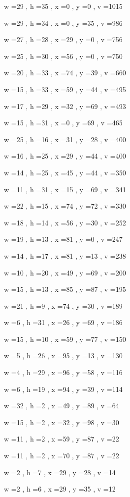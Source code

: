 \documentclass[11pt]{article}
\begin{document}
w =29 , h =35 , x =0 , y =0 , v =1015
\par
w =29 , h =34 , x =0 , y =35 , v =986
\par
w =27 , h =28 , x =29 , y =0 , v =756
\par
w =25 , h =30 , x =56 , y =0 , v =750
\par
w =20 , h =33 , x =74 , y =39 , v =660
\par
w =15 , h =33 , x =59 , y =44 , v =495
\par
w =17 , h =29 , x =32 , y =69 , v =493
\par
w =15 , h =31 , x =0 , y =69 , v =465
\par
w =25 , h =16 , x =31 , y =28 , v =400
\par
w =16 , h =25 , x =29 , y =44 , v =400
\par
w =14 , h =25 , x =45 , y =44 , v =350
\par
w =11 , h =31 , x =15 , y =69 , v =341
\par
w =22 , h =15 , x =74 , y =72 , v =330
\par
w =18 , h =14 , x =56 , y =30 , v =252
\par
w =19 , h =13 , x =81 , y =0 , v =247
\par
w =14 , h =17 , x =81 , y =13 , v =238
\par
w =10 , h =20 , x =49 , y =69 , v =200
\par
w =15 , h =13 , x =85 , y =87 , v =195
\par
w =21 , h =9 , x =74 , y =30 , v =189
\par
w =6 , h =31 , x =26 , y =69 , v =186
\par
w =15 , h =10 , x =59 , y =77 , v =150
\par
w =5 , h =26 , x =95 , y =13 , v =130
\par
w =4 , h =29 , x =96 , y =58 , v =116
\par
w =6 , h =19 , x =94 , y =39 , v =114
\par
w =32 , h =2 , x =49 , y =89 , v =64
\par
w =15 , h =2 , x =32 , y =98 , v =30
\par
w =11 , h =2 , x =59 , y =87 , v =22
\par
w =11 , h =2 , x =70 , y =87 , v =22
\par
w =2 , h =7 , x =29 , y =28 , v =14
\par
w =2 , h =6 , x =29 , y =35 , v =12
\par
\newpage
\end{document}
